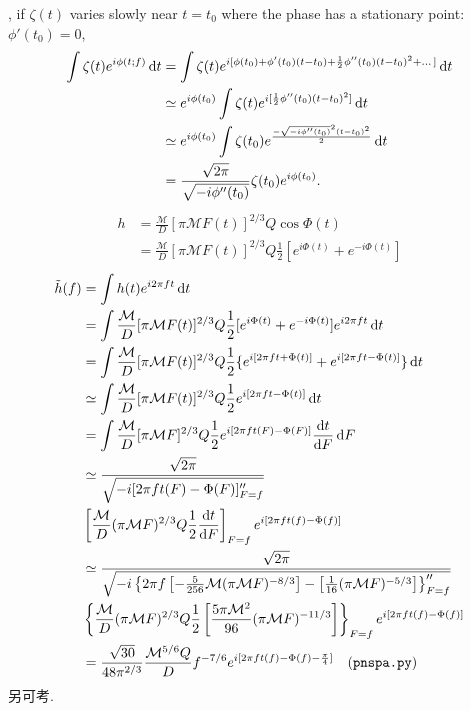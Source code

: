 \cite{Poisson1995}, if $\zeta(t)$ varies slowly near $t=t_0$ where the phase has a stationary point: $\phi'(t_0)=0$,
\begin{align}
    \int\zeta(t)e^{i\phi(t;f)}\,\mathrm{d} t&=\int\zeta(t)e^{i[\phi(t_0)+\phi'(t_0)(t-t_0)+\frac{1}{2}\phi''(t_0)(t-t_0)^2+\dots]}\,\mathrm{d} t\\
    &\simeq e^{i\phi(t_0)}\int\zeta(t)e^{i[\frac{1}{2}\phi''(t_0)(t-t_0)^2]}\,\mathrm{d} t\\
    &\simeq e^{i\phi(t_0)}\int\zeta(t_0)e^{\frac{-\sqrt{-i\phi''(t_0)}^2(t-t_0)^2}{2}}\,\mathrm{d} t\\
    &=\frac{\sqrt{2\pi}}{\sqrt{-i\phi''(t_0)}}\zeta(t_0)e^{i\phi(t_0)}.
\end{align}
\begin{align}
    h&=\frac{\mathcal{M}}{D}[\pi \mathcal{M}F(t)]^{2/3}Q\cos\Phi(t)\\
    &=\frac{\mathcal{M}}{D}[\pi \mathcal{M}F(t)]^{2/3}Q\frac{1}{2}[e^{i\Phi(t)}+e^{-i\Phi(t)}]
\end{align}
\begin{align}
    \tilde{h}(f)&=\int h(t)e^{i2\pi ft}\,\mathrm{d} t\\
    &=\int \frac{\mathcal{M}}{D}[\pi \mathcal{M}F(t)]^{2/3}Q\frac{1}{2}[e^{i\Phi(t)}+e^{-i\Phi(t)}]e^{i2\pi ft}\,\mathrm{d} t\\
    &=\int\frac{\mathcal{M}}{D}[\pi \mathcal{M}F(t)]^{2/3}Q\frac{1}{2}\{e^{i[2\pi ft+\Phi(t)]}+e^{i[2\pi ft-\Phi(t)]}\}\,\mathrm{d} t\\
    &\simeq\int\frac{\mathcal{M}}{D}[\pi \mathcal{M}F(t)]^{2/3}Q\frac{1}{2}e^{i[2\pi ft-\Phi(t)]}\,\mathrm{d} t\\
    &=\int\frac{\mathcal{M}}{D}[\pi \mathcal{M}F]^{2/3}Q\frac{1}{2}e^{i[2\pi ft(F)-\Phi(F)]}\frac{\mathrm{d} t}{\mathrm{d} F}\,\mathrm{d} F\\
    &\simeq\frac{\sqrt{2\pi}}{\sqrt{-i[2\pi ft(F)-\Phi(F)]''_{F=f}}}\\
    &\left[\frac{\mathcal{M}}{D}(\pi \mathcal{M}F)^{2/3}Q\frac{1}{2}\frac{\mathrm{d} t}{\mathrm{d} F}\right]_{F=f}e^{i[2\pi ft(f)-\Phi(f)]}\\
    &\simeq\frac{\sqrt{2\pi}}{\sqrt{-i\left\{2\pi f\left[-\frac{5}{256}\mathcal{M}(\pi \mathcal{M} F)^{-8/3}\right]-\left[\frac{1}{16}(\pi\mathcal{M} F)^{-5/3}\right]\right\}''_{F=f}}}\\
    &\left\{\frac{\mathcal{M}}{D}(\pi \mathcal{M}F)^{2/3}Q\frac{1}{2}\left[\frac{5\pi\mathcal{M}^2}{96}(\pi\mathcal{M} F)^{-11/3}\right]\right\}_{F=f}e^{i[2\pi ft(f)-\Phi(f)]}\\
    &=\frac{\sqrt{30}}{48\pi^{2/3}}\frac{\mathcal{M}^{5/6}Q}{D}f^{-7/6}e^{i[2\pi ft(f)-\Phi(f)-\frac{\pi}{4}]}\quad(\texttt{pnspa.py})
\end{align}
另可考\cite{Arun2005}.
